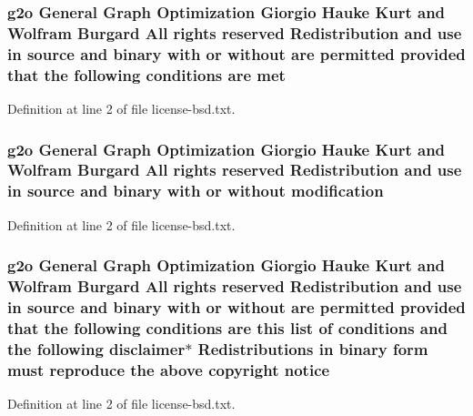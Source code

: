 \subsubsection[{\texorpdfstring{met}{met}}]{\setlength{\rightskip}{0pt plus 5cm}g2o General Graph Optimization Giorgio Hauke Kurt and Wolfram Burgard All rights reserved Redistribution and use in source and binary with or without are permitted provided that the following conditions are met}\hypertarget{license-bsd_8txt_ab354ff6dcd2abd4ceb3819d4944db7be}{}\label{license-bsd_8txt_ab354ff6dcd2abd4ceb3819d4944db7be}


Definition at line 2 of file license-\/bsd.\+txt.

\subsubsection[{\texorpdfstring{modification}{modification}}]{\setlength{\rightskip}{0pt plus 5cm}g2o General Graph Optimization Giorgio Hauke Kurt and Wolfram Burgard All rights reserved Redistribution and use in source and binary with or without modification}\hypertarget{license-bsd_8txt_a14fe16b9775a279c08ad78dbfbc7018e}{}\label{license-bsd_8txt_a14fe16b9775a279c08ad78dbfbc7018e}


Definition at line 2 of file license-\/bsd.\+txt.

\subsubsection[{\texorpdfstring{notice}{notice}}]{\setlength{\rightskip}{0pt plus 5cm}g2o General Graph Optimization Giorgio Hauke Kurt and Wolfram Burgard All rights reserved Redistribution and use in source and binary with or without are permitted provided that the following conditions are this list of conditions and the following disclaimer$\ast$ Redistributions in binary form must reproduce the above copyright notice}\hypertarget{license-bsd_8txt_a23684e2ec92c6cfdb0e3a78bbaa15a16}{}\label{license-bsd_8txt_a23684e2ec92c6cfdb0e3a78bbaa15a16}


Definition at line 2 of file license-\/bsd.\+txt.

